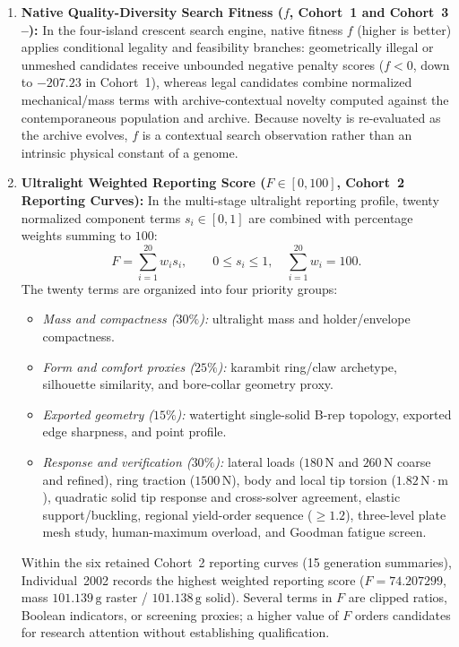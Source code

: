 \begin{enumerate}[leftmargin=*,nosep]
\item \textbf{Native Quality-Diversity Search Fitness ($f$, Cohort~1  and Cohort~3 --):} In the four-island crescent search engine, native fitness $f$ (higher is better) applies conditional legality and feasibility branches: geometrically illegal or unmeshed candidates receive unbounded negative penalty scores ($f < 0$, down to $-207.23$ in Cohort~1), whereas legal candidates combine normalized mechanical/mass terms with archive-contextual novelty computed against the contemporaneous population and archive. Because novelty is re-evaluated as the archive evolves, $f$ is a contextual search observation rather than an intrinsic physical constant of a genome.
\item \textbf{Ultralight Weighted Reporting Score ($F \in [0,100]$, Cohort~2 Reporting Curves):} In the multi-stage ultralight reporting profile, twenty normalized component terms $s_i \in [0,1]$ are combined with percentage weights summing to $100$:
\begin{equation}
 F = \sum_{i=1}^{20} w_i s_i,\qquad 0\le s_i \le 1,\quad \sum_{i=1}^{20} w_i = 100.
\end{equation}
The twenty terms are organized into four priority groups:
  \begin{itemize}[leftmargin=*,nosep]
  \item \emph{Mass and compactness ($30\%$):} ultralight mass and holder/envelope compactness.
  \item \emph{Form and comfort proxies ($25\%$):} karambit ring/claw archetype, silhouette similarity, and bore-collar geometry proxy.
  \item \emph{Exported geometry ($15\%$):} watertight single-solid B-rep topology, exported edge sharpness, and point profile.
  \item \emph{Response and verification ($30\%$):} lateral loads ($180\,\mathrm{N}$ and $260\,\mathrm{N}$ coarse and refined), ring traction ($1500\,\mathrm{N}$), body and local tip torsion ($1.82\,\mathrm{N\cdot m}$), quadratic solid tip response and cross-solver agreement, elastic support/buckling, regional yield-order sequence ($\ge 1.2$), three-level plate mesh study, human-maximum overload, and Goodman fatigue screen.
  \end{itemize}
Within the six retained Cohort~2 reporting curves (15 generation summaries), Individual~2002 records the highest weighted reporting score ($F = 74.207299$, mass $101.139\,\mathrm{g}$ raster / $101.138\,\mathrm{g}$ solid). Several terms in $F$ are clipped ratios, Boolean indicators, or screening proxies; a higher value of $F$ orders candidates for research attention without establishing qualification.

\end{enumerate}
